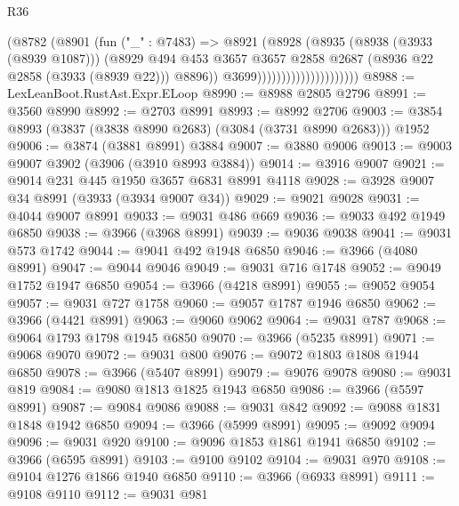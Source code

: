 \begin{lexlean}{R36}
\begin{coremodule}
                                      (@8782
                                        (@8901
                                          (fun ("_" : @7483) =>
                                          @8921
                                            (@8928
                                              (@8935
                                                (@8938 (@3933 (@8939 @1087)))
                                                (@8929
                                                  @494
                                                  @453
                                                  @3657
                                                  @3657
                                                  @2858
                                                  @2687
                                                  (@8936 @22 @2858 (@3933 (@8939 @22)))
                                                  @8896))
                                              @3699)))))))))))))))))))))
@8988 := LexLeanBoot.RustAst.Expr.ELoop
@8990 := @8988 @2805 @2796
@8991 := @3560 @8990
@8992 := @2703 @8991
@8993 := @8992 @2706
@9003 := @3854 @8993 (@3837 (@3838 @8990 @2683) (@3084 (@3731 @8990 @2683))) @1952
@9006 := @3874 (@3881 @8991) @3884
@9007 := @3880 @9006
@9013 := @9003 @9007 @3902 (@3906 (@3910 @8993 @3884))
@9014 := @3916 @9007
@9021 := @9014 @231 @445 @1950 @3657 @6831 @8991 @4118
@9028 := @3928 @9007 @34 @8991 (@3933 (@3934 @9007 @34))
@9029 := @9021 @9028
@9031 := @4044 @9007 @8991
@9033 := @9031 @486 @669
@9036 := @9033 @492 @1949 @6850
@9038 := @3966 (@3968 @8991)
@9039 := @9036 @9038
@9041 := @9031 @573 @1742
@9044 := @9041 @492 @1948 @6850
@9046 := @3966 (@4080 @8991)
@9047 := @9044 @9046
@9049 := @9031 @716 @1748
@9052 := @9049 @1752 @1947 @6850
@9054 := @3966 (@4218 @8991)
@9055 := @9052 @9054
@9057 := @9031 @727 @1758
@9060 := @9057 @1787 @1946 @6850
@9062 := @3966 (@4421 @8991)
@9063 := @9060 @9062
@9064 := @9031 @787
@9068 := @9064 @1793 @1798 @1945 @6850
@9070 := @3966 (@5235 @8991)
@9071 := @9068 @9070
@9072 := @9031 @800
@9076 := @9072 @1803 @1808 @1944 @6850
@9078 := @3966 (@5407 @8991)
@9079 := @9076 @9078
@9080 := @9031 @819
@9084 := @9080 @1813 @1825 @1943 @6850
@9086 := @3966 (@5597 @8991)
@9087 := @9084 @9086
@9088 := @9031 @842
@9092 := @9088 @1831 @1848 @1942 @6850
@9094 := @3966 (@5999 @8991)
@9095 := @9092 @9094
@9096 := @9031 @920
@9100 := @9096 @1853 @1861 @1941 @6850
@9102 := @3966 (@6595 @8991)
@9103 := @9100 @9102
@9104 := @9031 @970
@9108 := @9104 @1276 @1866 @1940 @6850
@9110 := @3966 (@6933 @8991)
@9111 := @9108 @9110
@9112 := @9031 @981

\end{coremodule}
\end{lexlean}

